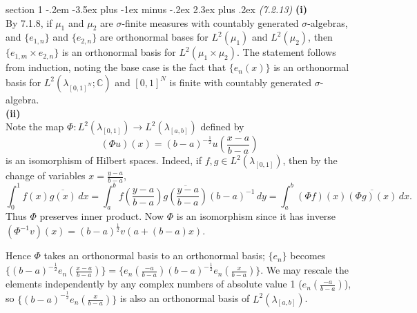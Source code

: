 \documentclass[12pt]{article}
\makeatletter
\theoremstyle{norm}
\newcommand{\C}[0]{\mathbb{C}}
\newcommand{\rc}[1]{\frac{1}{#1}}
\newcommand{\la}[0]{\lambda}
\newcommand{\si}[0]{\sigma}
\newcommand{\pa}[1]{\left( {#1} \right)}
\newcommand{\subprob}[1]{\noindent\textbf{#1}\\}
\newcommand{\pf}[2]{\pa{\frac{#1}{#2}}}
\newcommand{\sia}[0]{ $\si$-algebra}
\newcommand{\ol}[1]{\overline{#1}}
\newenvironment{problem}{\@startsection
       {section}
       {1}
       {-.2em}
       {-3.5ex plus -1ex minus -.2ex}
       {2.3ex plus .2ex}
       {\pagebreak[3]%
       \large\bf\noindent{Problem }
       }
       }
       {%
       }
\makeatother
\begin{document}
\begin{problem}{\it (7.2.13)}
\subprob{(i)}
By 7.1.8, if $\mu_1$ and $\mu_2$ are $\si$-finite measures with countably generated \sia s, and $\{e_{1,n}\}$ and $\{e_{2,n}\}$ are orthonormal bases for $L^2(\mu_1)$ and $L^2(\mu_2)$, then $\{e_{1,m}\times e_{2,n}\}$ is an orthonormal basis for $L^2(\mu_1\times \mu_2)$. The statement follows from induction, noting the base case is the fact that $\{ e_n(x)\}$ is an orthonormal basis for $L^2(\la_{[0,1]^N};\C)$ and $[0,1]^N$ is finite with countably generated \sia.\\

\subprob{(ii)}
Note the map $\Phi:L^2(\la_{[0,1]})\to L^2(\la_{[a,b]})$ defined by
\[
(\Phi u)(x)=(b-a)^{-\rc 2} u\pa{\frac{x-a}{b-a}}
\]
 is an isomorphism of Hilbert spaces. Indeed, if $f,g\in L^2(\la_{[0,1]})$,  then by the change of variables $x=\frac{y-a}{b-a}$,
\[
\int_0^1 f(x)\ol{g(x)}\,dx=\int_a^b f\pf{y-a}{b-a}\ol{g\pf{y-a}{b-a}} (b-a)^{-1}\,dy=\int_a^b (\Phi f)(x)\ol{(\Phi g)(x)}\,dx.
\]
Thus $\Phi$ preserves inner product. Now $\Phi$ is an isomorphism since it has inverse $(\Phi^{-1} v)(x)=(b-a)^{\rc 2}v(a+(b-a)x)$. 

Hence $\Phi$ takes an orthonormal basis to an orthonormal basis; $\{e_n\}$ becomes $\{(b-a)^{-\rc2} e_n\pf{x-a}{b-a}\}=\{e_n\pf{-a}{b-a}(b-a)^{-\rc2}e_n\pf{x}{b-a}\}$. We may rescale the elements independently by any complex numbers of absolute value 1 ($e_n\pf{-a}{b-a}$), so $\{(b-a)^{-\rc2}e_n\pf{x}{b-a}\}$ is also an orthonormal basis of $L^2(\la_{[a,b]})$.\\


\end{problem}
\end{document}
